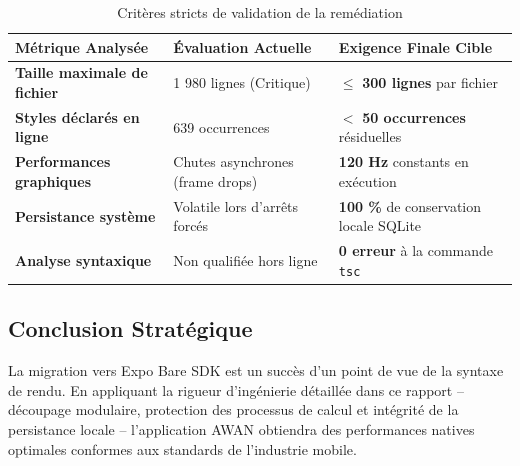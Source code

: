 \documentclass[11pt, a4paper]{article}
\begin{document}
\begin{table}[htbp]
\centering
\caption{Critères stricts de validation de la remédiation}
\label{tab:kpi_final}
\begin{tabularx}{\textwidth}{@{}lXX@{}}
\toprule
\textbf{Métrique Analysée} & \textbf{Évaluation Actuelle} & \textbf{Exigence Finale Cible} \\ \midrule
\textbf{Taille maximale de fichier} & 1 980 lignes (Critique) & $\leq$ \textbf{300 lignes} par fichier \\
\textbf{Styles déclarés en ligne} & 639 occurrences & $<$ \textbf{50 occurrences} résiduelles \\
\textbf{Performances graphiques} & Chutes asynchrones (frame drops) & \textbf{120 Hz} constants en exécution \\
\textbf{Persistance système} & Volatile lors d'arrêts forcés & \textbf{100 \%} de conservation locale SQLite \\
\textbf{Analyse syntaxique} & Non qualifiée hors ligne & \textbf{0 erreur} à la commande \texttt{tsc} \\ \bottomrule
\end{tabularx}
\end{table}

\subsection{Conclusion Stratégique}
La migration vers Expo Bare SDK est un succès d'un point de vue de la syntaxe de rendu. En appliquant la rigueur d'ingénierie détaillée dans ce rapport -- découpage modulaire, protection des processus de calcul et intégrité de la persistance locale -- l'application AWAN obtiendra des performances natives optimales conformes aux standards de l'industrie mobile.
\end{document}
